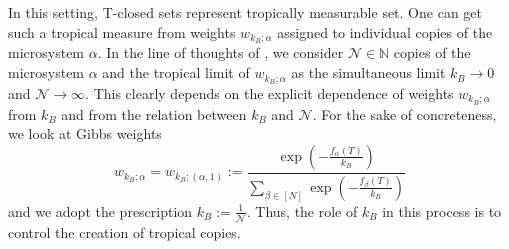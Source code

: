 \documentclass[11pt,british,reqno]{article}
\numberwithin{equation}{section}
\numberwithin{figure}{section}
\numberwithin{table}{section}
\theoremstyle{definition}
\theoremstyle{definition}
\theoremstyle{plain}
\theoremstyle{plain}
\theoremstyle{remark}
\theoremstyle{plain}
\numberwithin{equation}{section}
\numberwithin{figure}{section}
\numberwithin{table}{section}
\theoremstyle{plain}
\begin{document}
In this setting, $\mathrm{T}$-closed sets represent tropically measurable set. One can get such a tropical measure from weights $w_{k_{B};\alpha}$ assigned to individual copies of the microsystem $\alpha$. In the line of thoughts of \cite{AK2015}, we consider $\mathcal{N}\in\mathbb{N}$ copies of the microsystem $\alpha$ and the tropical limit of $w_{k_{B};\alpha}$ as the simultaneous
limit $k_{B}\rightarrow0$ and $\mathcal{N}\rightarrow\infty$. This
clearly depends on the explicit dependence of weights $w_{k_{B};\alpha}$
from $k_{B}$ and from the relation between $k_{B}$ and $\mathcal{N}$.
For the sake of concreteness, we look at Gibbs weights 
\begin{equation}
w_{k_{B};\alpha}=w_{k_{B};(\alpha,1)}:=\frac{\exp\left(-\frac{f_{\alpha}(T)}{k_{B}}\right)}{{\displaystyle \sum_{\beta\in[N]}}\exp\left(-\frac{f_{\beta}(T)}{k_{B}}\right)}\label{eq: Gibbs' weights}
\end{equation}
and we adopt the prescription ${\displaystyle k_{B}:=\frac{1}{\mathcal{N}}}$. Thus, the role of $k_B$ in this process is to control the creation of tropical copies. 
\end{document}
